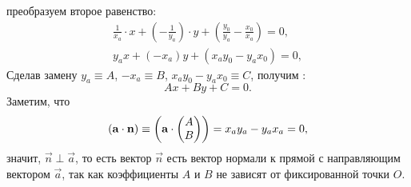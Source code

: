 преобразуем второе равенство:
\begin{gather*}
	\frac{1}{x_a} \cdot x + \left( - \frac{1}{y_a} \right) \cdot y + \left( \frac{y_0}{y_a} - \frac{x_0}{x_a} \right) = 0,\\
	y_a x + (-x_a)y + (x_a y_0 - y_a x_0) = 0,
\end{gather*}
Сделав замену $y_a \equiv A$, $-x_a \equiv B$, $x_a y_0 - y_a x_0 \equiv C$, получим :
\begin{equation}
	Ax + By + C = 0.
\end{equation}
Заметим, что
\begin{equation*}
	\left(\mathbf{a} \cdot \mathbf{n}\right) \equiv \left(\mathbf{a} \cdot \mathbf{
	\begin{pmatrix}
		A\\
		B
	\end{pmatrix}}\right) = x_a y_a - y_a x_a = 0,
\end{equation*}
значит, $\vec{n} \perp \vec{a}$, то есть вектор $\vec{n}$ есть вектор нормали к прямой с направляющим вектором $\vec{a}$, так как коэффициенты $A$ и $B$ не зависят от фиксированной точки $O$.
